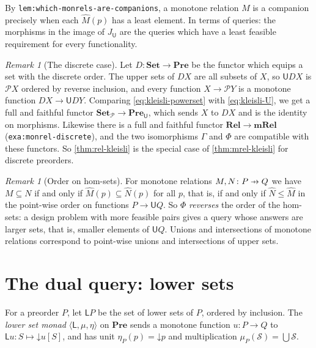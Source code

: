 \documentclass[11pt,a4paper]{article}
\theoremstyle{plain}
\theoremstyle{definition}
\theoremstyle{remark}
\newtheorem{remark}[theorem]{Remark}
\newcommand{\Cat}[1]{\mathbf{#1}}
\newcommand{\Set}{\Cat{Set}}
\newcommand{\Rel}{\Cat{Rel}}
\newcommand{\Pre}{\Cat{Pre}}
\newcommand{\mRel}{\Cat{mRel}}
\newcommand{\U}{\mathsf{U}}
\newcommand{\Lo}{\mathsf{L}}
\newcommand{\pow}{\mathcal{P}}
\newcommand{\SetP}{\Set_{\pow}}
\newcommand{\PreU}{\Pre_{\U}}
\newcommand{\tup}[1]{\langle #1 \rangle}
\newcommand{\profto}{\mathrel{\ooalign{\hfil$\mapstochar\mkern 5mu$\hfil\cr$\to$\cr}}}
\newcommand{\dn}{\mathord{\downarrow}}
\newcommand{\lbl}[1]{\nolinkurl{#1}}
\begin{document}
By \lbl{lem:which-monrels-are-companions}, a monotone relation $M$ is a companion precisely when each $\widehat{M}(p)$ has a least element.
In terms of queries: the morphisms in the image of $J_{\U}$ are the queries which have a least feasible requirement for every functionality.

\begin{remark}[The discrete case]
    \label{rem:discrete}
    Let $D \colon \Set \to \Pre$ be the functor which equips a set with the discrete order.
    The upper sets of $DX$ are all subsets of $X$, so $\U D X$ is $\pow X$ ordered by reverse inclusion, and every function $X \to \pow Y$ is a monotone function $DX \to \U DY$.
    Comparing \cref{eq:kleisli-powerset} with \cref{eq:kleisli-U}, we get a full and faithful functor $\SetP \to \PreU$, which sends $X$ to $DX$ and is the identity on morphisms.
    Likewise there is a full and faithful functor $\Rel \to \mRel$ (\lbl{exa:monrel-discrete}), and the two isomorphisms $\Gamma$ and $\Phi$ are compatible with these functors.
    So \cref{thm:rel-kleisli} is the special case of \cref{thm:mrel-kleisli} for discrete preorders.
\end{remark}

\begin{remark}[Order on hom-sets]
    For monotone relations $M, N \colon P \profto Q$ we have $M \subseteq N$ if and only if $\widehat{M}(p) \subseteq \widehat{N}(p)$ for all $p$, that is, if and only if $\widehat{N} \leq \widehat{M}$ in the point-wise order on functions $P \to \U Q$.
    So $\Phi$ \emph{reverses} the order of the hom-sets: a design problem with more feasible pairs gives a query whose answers are larger sets, that is, smaller elements of $\U Q$.
    Unions and intersections of monotone relations correspond to point-wise unions and intersections of upper sets.
\end{remark}

\section{The dual query: lower sets}
\label{sec:lower}

For a preorder $P$, let $\Lo P$ be the set of lower sets of $P$, ordered by inclusion.
The \emph{lower set monad} $\tup{\Lo, \mu, \eta}$ on $\Pre$ sends a monotone function $u \colon P \to Q$ to $\Lo u \colon S \mapsto \dn u[S]$, and has unit $\eta_P(p) = \dn p$ and multiplication $\mu_P(\mathcal{S}) = \bigcup \mathcal{S}$.
\end{document}
